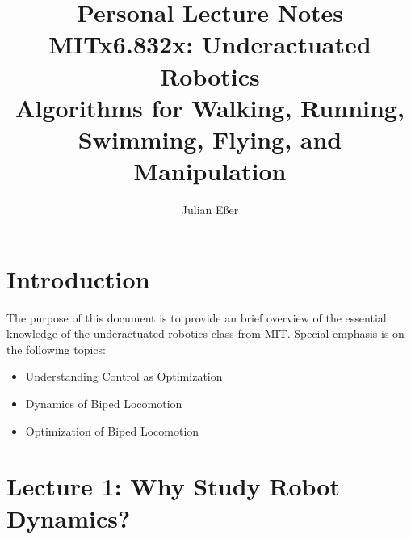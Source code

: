 \documentclass[10pt,english, openany]{book}
\begin{document}

\author{Julian Eßer}
\title{Personal Lecture Notes \\
MITx6.832x: Underactuated Robotics \\
{\Large Algorithms for Walking, Running, Swimming, Flying, and Manipulation}}

\begin{titlepage}
\maketitle
\end{titlepage}

\tableofcontents{}

\mainmatter

\chapter{Introduction}\label{chapt:intro}
The purpose of this document is to provide an brief overview of the essential knowledge of the underactuated robotics class \cite{mitx6.832web} from MIT. Special emphasis is on the following topics:\\
\begin{itemize}
\item Understanding Control as Optimization
\item Dynamics of Biped Locomotion
\item Optimization of Biped Locomotion
\end{itemize}


\chapter{Lecture 1: Why Study Robot Dynamics?}
\end{document}
